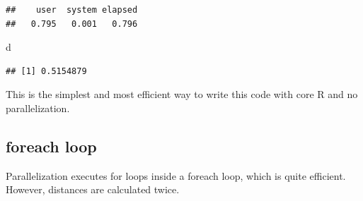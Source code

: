 \documentclass[
  12pt,
  american,
  a4paper,
  extrafontsizes,onecolumn,openright
  ]{memoir}
\newenvironment{Shaded}{\begin{snugshade}}{\end{snugshade}}
\newcommand{\AttributeTok}[1]{\textcolor[rgb]{0.13,0.29,0.53}{#1}}
\newcommand{\ControlFlowTok}[1]{\textcolor[rgb]{0.13,0.29,0.53}{\textbf{#1}}}
\newcommand{\DecValTok}[1]{\textcolor[rgb]{0.00,0.00,0.81}{#1}}
\newcommand{\FunctionTok}[1]{\textcolor[rgb]{0.13,0.29,0.53}{\textbf{#1}}}
\newcommand{\NormalTok}[1]{#1}
\newcommand{\OtherTok}[1]{\textcolor[rgb]{0.56,0.35,0.01}{#1}}
\newcommand{\SpecialCharTok}[1]{\textcolor[rgb]{0.81,0.36,0.00}{\textbf{#1}}}
\newcommand{\StringTok}[1]{\textcolor[rgb]{0.31,0.60,0.02}{#1}}
\begin{document}
\begin{verbatim}
##    user  system elapsed 
##   0.795   0.001   0.796
\end{verbatim}

\begin{Shaded}
\begin{Highlighting}[]
\NormalTok{d}
\end{Highlighting}
\end{Shaded}

\begin{verbatim}
## [1] 0.5154879
\end{verbatim}

\normalsize

This is the simplest and most efficient way to write this code with core R and no parallelization.

\subsection{foreach loop}\label{foreach-loop}

Parallelization executes for loops inside a foreach loop, which is quite efficient.
However, distances are calculated twice.

\scriptsize

\begin{Shaded}
\end{Shaded}
\end{document}

